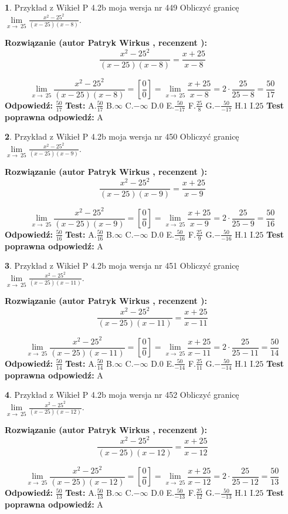 \documentclass[12pt, a4paper]{article}
\theoremstyle{definition} %
\newtheorem{zad}{}
\newcommand{\zadStart}[1]{\begin{zad}#1\newline}
\newcommand{\zadStop}{\end{zad}}
\newcommand{\rozwStart}[2]{\noindent \textbf{Rozwiązanie (autor #1 , recenzent #2): }\newline}
\newcommand{\rozwStop}{\newline}
\newcommand{\odpStart}{\noindent \textbf{Odpowiedź:}\newline}
\newcommand{\odpStop}{\newline}
\newcommand{\testStart}{\noindent \textbf{Test:}\newline}
\newcommand{\testStop}{\newline}
\newcommand{\kluczStart}{\noindent \textbf{Test poprawna odpowiedź:}\newline}
\newcommand{\kluczStop}{\newline}
\begin{document}
\zadStart{Przykład z Wikieł P 4.2b moja wersja nr 449}
Obliczyć granicę $\lim\limits_{x\to\ 25}\frac{x^{2}-25^{2}}{(x-25)(x-8)}$.
\zadStop
\rozwStart{Patryk Wirkus}{}
$$\frac{x^{2}-25^{2}}{(x-25)(x-8)}=\frac{x+25}{x-8}$$

$$\lim\limits_{x\to\ 25}\frac{x^{2}-25^{2}}{(x-25)(x-8)}=[\frac{0}{0}]=\lim\limits_{x\to\ 25}\frac{x+25}{x-8}=2 \cdot \frac{25}{25-8} = \frac{50}{17}$$
\rozwStop
\odpStart
$\frac{50}{17}$
\odpStop
\testStart
A.$\frac{50}{17}$
B.$\infty$
C.$-\infty$
D.$0$
E.$\frac{50}{-17}$
F.$\frac{25}{8}$
G.$-\frac{50}{-17}$
H.$1$
I.$25$
\testStop
\kluczStart
A
\kluczStop



\zadStart{Przykład z Wikieł P 4.2b moja wersja nr 450}
Obliczyć granicę $\lim\limits_{x\to\ 25}\frac{x^{2}-25^{2}}{(x-25)(x-9)}$.
\zadStop
\rozwStart{Patryk Wirkus}{}
$$\frac{x^{2}-25^{2}}{(x-25)(x-9)}=\frac{x+25}{x-9}$$

$$\lim\limits_{x\to\ 25}\frac{x^{2}-25^{2}}{(x-25)(x-9)}=[\frac{0}{0}]=\lim\limits_{x\to\ 25}\frac{x+25}{x-9}=2 \cdot \frac{25}{25-9} = \frac{50}{16}$$
\rozwStop
\odpStart
$\frac{50}{16}$
\odpStop
\testStart
A.$\frac{50}{16}$
B.$\infty$
C.$-\infty$
D.$0$
E.$\frac{50}{-16}$
F.$\frac{25}{9}$
G.$-\frac{50}{-16}$
H.$1$
I.$25$
\testStop
\kluczStart
A
\kluczStop



\zadStart{Przykład z Wikieł P 4.2b moja wersja nr 451}
Obliczyć granicę $\lim\limits_{x\to\ 25}\frac{x^{2}-25^{2}}{(x-25)(x-11)}$.
\zadStop
\rozwStart{Patryk Wirkus}{}
$$\frac{x^{2}-25^{2}}{(x-25)(x-11)}=\frac{x+25}{x-11}$$

$$\lim\limits_{x\to\ 25}\frac{x^{2}-25^{2}}{(x-25)(x-11)}=[\frac{0}{0}]=\lim\limits_{x\to\ 25}\frac{x+25}{x-11}=2 \cdot \frac{25}{25-11} = \frac{50}{14}$$
\rozwStop
\odpStart
$\frac{50}{14}$
\odpStop
\testStart
A.$\frac{50}{14}$
B.$\infty$
C.$-\infty$
D.$0$
E.$\frac{50}{-14}$
F.$\frac{25}{11}$
G.$-\frac{50}{-14}$
H.$1$
I.$25$
\testStop
\kluczStart
A
\kluczStop



\zadStart{Przykład z Wikieł P 4.2b moja wersja nr 452}
Obliczyć granicę $\lim\limits_{x\to\ 25}\frac{x^{2}-25^{2}}{(x-25)(x-12)}$.
\zadStop
\rozwStart{Patryk Wirkus}{}
$$\frac{x^{2}-25^{2}}{(x-25)(x-12)}=\frac{x+25}{x-12}$$

$$\lim\limits_{x\to\ 25}\frac{x^{2}-25^{2}}{(x-25)(x-12)}=[\frac{0}{0}]=\lim\limits_{x\to\ 25}\frac{x+25}{x-12}=2 \cdot \frac{25}{25-12} = \frac{50}{13}$$
\rozwStop
\odpStart
$\frac{50}{13}$
\odpStop
\testStart
A.$\frac{50}{13}$
B.$\infty$
C.$-\infty$
D.$0$
E.$\frac{50}{-13}$
F.$\frac{25}{12}$
G.$-\frac{50}{-13}$
H.$1$
I.$25$
\testStop
\kluczStart
A
\kluczStop
\end{document}
